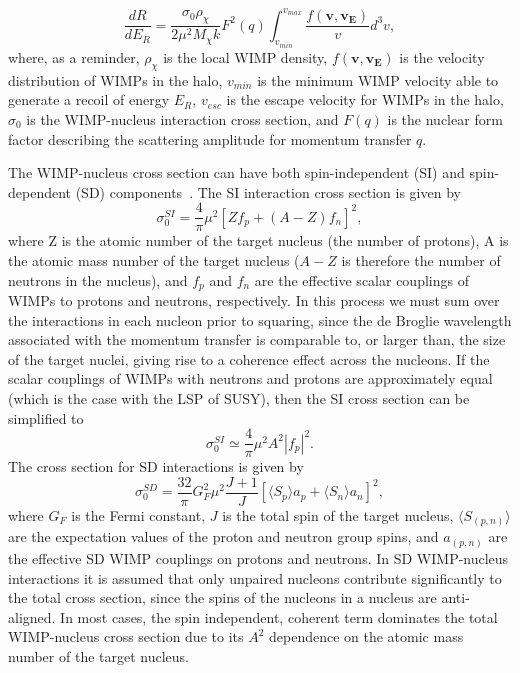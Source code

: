 \begin{equation} \label{final_dRdER_2}
\frac{dR}{dE_R}=\frac{\sigma_0 \rho_\chi}{2 \mu^2 M_\chi k} F^2(q)  \int_{v_{min}}^{v_{max}} \frac{f(\mathbf{v},\mathbf{v_E})}{v} d^3v, 
\end{equation}
where, as a reminder, $\rho_\chi$ is the local WIMP density, $f(\mathbf{v},\mathbf{v_E})$ is the velocity distribution of WIMPs in the halo, $v_{min}$ is the minimum WIMP velocity able to generate a recoil of energy $E_R$, $v_{esc}$ is the escape velocity for WIMPs in the halo, $\sigma_0$ is the WIMP-nucleus interaction cross section, and $F(q)$ is the nuclear form factor describing the scattering amplitude for momentum transfer $q$.

The WIMP-nucleus cross section can have both spin-independent (SI) and spin-dependent (SD) components~\cite{Shan}. The SI interaction cross section is given by
\[\sigma_0^{SI}=\frac{4}{\pi}\mu^2 \left[Z f_p + (A - Z) f_n \right]^2,\]
where Z is the atomic number of the target nucleus (the number of protons), A is the atomic mass number of the target nucleus ($A-Z$ is therefore the number of neutrons in the nucleus), and $f_p$ and $f_n$ are the effective scalar couplings of WIMPs to protons and neutrons, respectively.  In this process we must sum over the interactions in each nucleon prior to squaring, since the de Broglie wavelength associated with the momentum transfer is comparable to, or larger than, the size of the target nuclei, giving rise to a coherence effect across the nucleons.  If the scalar couplings of WIMPs with neutrons and protons are approximately equal (which is the case with the LSP of SUSY), then the SI cross section can be simplified to
\[\sigma_0^{SI} \simeq \frac{4}{\pi}\mu^2 A^2 |f_p|^2. \]
The cross section for SD interactions is given by
\[\sigma_0^{SD}=\frac{32}{\pi}G_F^2\mu^2\frac{J+1}{J} \left[\langle S_p \rangle a_p + \langle S_n \rangle a_n \right]^2, \]
where $G_F$ is the Fermi constant, $J$ is the total spin of the target nucleus, $\langle S_{(p,n)} \rangle$ are the expectation values of the proton and neutron group spins, and $a_{(p,n)}$ are the effective SD WIMP couplings on protons and neutrons.  In SD WIMP-nucleus interactions it is assumed that only unpaired nucleons contribute significantly to the total cross section, since the spins of the nucleons in a nucleus are anti-aligned.  In most cases, the spin independent, coherent term dominates the total WIMP-nucleus cross section due to its $A^2$ dependence on the atomic mass number of the target nucleus.  

